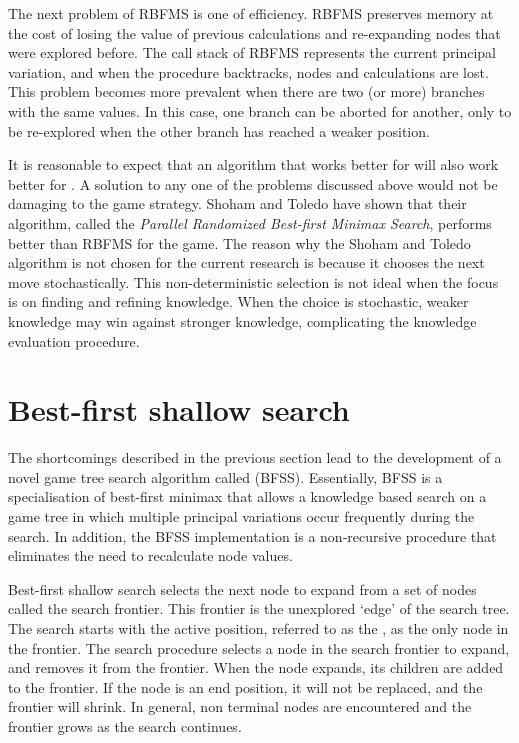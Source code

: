 The next problem of RBFMS is one of efficiency.  RBFMS preserves memory at the cost of losing the value of previous calculations and re-expanding nodes that were explored before. The call stack of RBFMS represents the current principal variation, and when the procedure backtracks, nodes and calculations are lost. This problem becomes more prevalent when there are two (or more) branches with the same values.  In this case, one branch can be aborted for another, only to be re-explored when the other branch has reached a weaker position.     

It is reasonable to expect that an algorithm that works better for  will also work better for .  A solution to any one of the problems discussed above would not be damaging to the  game strategy.  Shoham and Toledo have shown that their algorithm, called the {\it Parallel Randomized Best-first Minimax Search}, performs better than RBFMS for the  game.  The reason why the Shoham and Toledo algorithm is not chosen for the current research is because it chooses the next move stochastically.   This non-deterministic selection is not ideal when the focus is on finding and refining knowledge. When the choice is stochastic, weaker knowledge may win against stronger knowledge, complicating the knowledge evaluation procedure.  

\section{Best-first shallow search}
\label{sec:tree-frontier}
The shortcomings described in the previous section lead to the development of a novel game tree search algorithm called  (BFSS). Essentially, BFSS is a specialisation of  best-first minimax that allows a knowledge based search on a game tree in which multiple principal variations occur frequently during the search.  In addition, the BFSS implementation is a non-recursive procedure that eliminates the need to recalculate node values.     

Best-first shallow search selects the next node to expand from a set of nodes called the search frontier.  This frontier is the unexplored `edge' of the search tree.  The search starts with the active position, referred to as the , as the only node in the frontier. The search procedure selects a node in the search frontier to expand, and removes it from the frontier.  When the node expands, its children are added to the frontier. If the node is an end position, it will not be replaced, and the frontier will shrink.  In general, non terminal nodes are encountered and the frontier grows as the search continues.    

